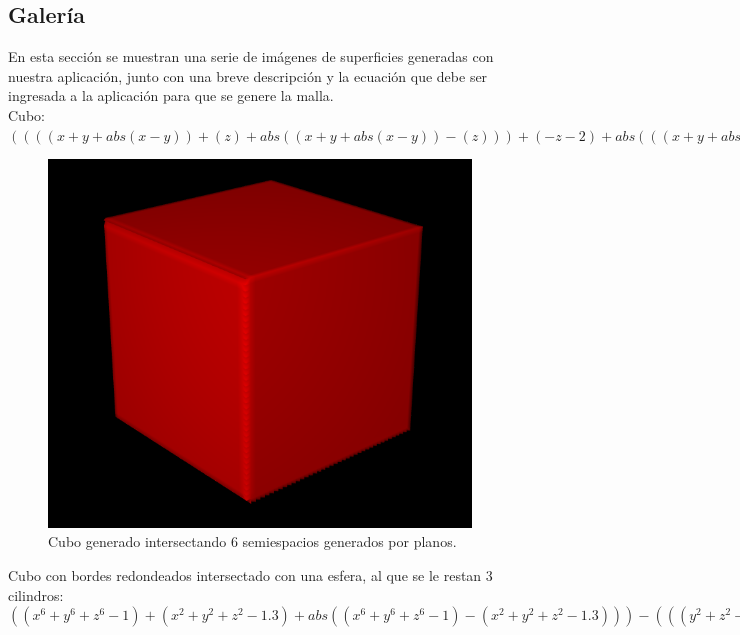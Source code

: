 \documentclass[12pt]{article}
\begin{document}
\subsection{Galería}
En esta sección se muestran una serie de imágenes de superficies generadas con nuestra aplicación, junto con una breve descripción y la ecuación que debe ser ingresada a la aplicación para que se genere la malla.
\\Cubo: $((((x+y+abs(x-y))+(z)+ abs((x+y+abs(x-y))-(z)))+ (-z-2)+abs(((x+y+abs (x-y))+(z)+ abs((x+y+abs(x-y))-(z))) -(-z-2)))+(-x-2)+ abs((((x+y+ abs(x-y))+(z)+ abs((x+y+abs (x-y)) -(z)))+(-z-2) +abs(((x+y+abs(x-y))+(z)+ abs((x+y+ abs(x-y)) -(z)))- (-z-2)))- (-x-2))) + (-y-2) +abs((((( x+y + abs(x-y))+(z)+ abs((x+ y+abs(x-y))-(z)))+(-z-2)+ abs(((x+ y+ abs(x-y))+ (z)+abs((x+y+abs (x-y))-(z)))-(-z-2)))+ (-x-2) +abs((((x+y+abs(x-y))+(z)+ abs((x+y+ abs(x-y))-(z)))+(-z-2)+abs(((x+y+abs(x-y))+(z)+ abs((x+y+abs (x-y))-(z)))-(-z-2)))-(-x-2)))-(-y-2))$
\begin{figure}[h!]
\includegraphics[width=0.7\linewidth,center]{g1.png}
\caption{Cubo generado intersectando 6 semiespacios generados por planos.}
\end{figure}
\clearpage
Cubo con bordes redondeados intersectado con una esfera, al que se le restan 3 cilindros: $((x^6+y^6+z^6-1) +(x^2+y^2+z^2-1.3) +abs((x^6+y^6+z^6-1) -(x^2+y^2+z^2-1.3 ))) -(((y^2+z^2-.5) +(x^2+z^2-.5) -abs((y^2+z^2-.5)-(x^2+z^2-.5))) +(x^2+y^2-.5) -abs(((y^2+z^2-.5)+ (x^2+z^2-.5) - abs ((y^2+z^2-.5) - (x^2+z^2-.5))) -(x^2+y^2-.5))) + abs(((x^6+y^6+z^6-1) +(x^2+y^2+z^2-1.3) + abs((x^6+y^6+z^6-1) -(x^2+y^2+z^2-1.3))) +(((y^2+z^2-.5) +(x^2+z^2-.5)-abs((y^2+z^2-.5)-(x^2+z^2-.5)))+(x^2+y^2-.5)-abs(((y^2+z^2-.5)+(x^2+z^2-.5)-abs((y^2+z^2-.5)-(x^2+z^2-.5)))-(x^2+y^2-.5))))$\\ 
\end{document}
